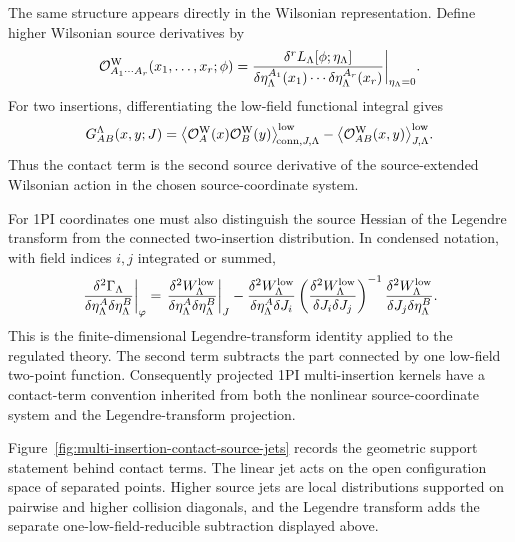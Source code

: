 The same structure appears directly in the Wilsonian representation.  Define
higher Wilsonian source derivatives by
\[
  \mathcal O^{\rm W}_{A_1\cdots A_r}(x_1,\ldots,x_r;\phi)
  =
  \frac{\delta^r L_\Lambda[\phi;\eta_\Lambda]}
       {\delta\eta_\Lambda^{A_1}(x_1)\cdots
        \delta\eta_\Lambda^{A_r}(x_r)}
  \bigg|_{\eta_\Lambda=0}.
\]
For two insertions, differentiating the low-field functional integral gives
\begin{equation}
  G^\Lambda_{AB}(x,y;J)
  =
  \bigl\langle
    \mathcal O^{\rm W}_A(x)\mathcal O^{\rm W}_B(y)
  \bigr\rangle_{\!{\rm conn},J,\Lambda}^{\rm low}
  -
  \bigl\langle
    \mathcal O^{\rm W}_{AB}(x,y)
  \bigr\rangle_{J,\Lambda}^{\rm low}.
  \label{eq:wilsonian-two-insertion-contact-term}
\end{equation}
Thus the contact term is the second source derivative of the
source-extended Wilsonian action in the chosen source-coordinate system.

For 1PI coordinates one must also distinguish the source Hessian of the
Legendre transform from the connected two-insertion distribution.  In
condensed notation, with field indices \(i,j\) integrated or summed,
\[
  \left.\frac{\delta^2\Gamma_\Lambda}
    {\delta\eta_\Lambda^A\delta\eta_\Lambda^B}\right|_\varphi
  =
  \left.\frac{\delta^2 W_\Lambda^{\rm low}}
    {\delta\eta_\Lambda^A\delta\eta_\Lambda^B}\right|_J
  -
  \frac{\delta^2 W_\Lambda^{\rm low}}
       {\delta\eta_\Lambda^A\delta J_i}
  \left(
    \frac{\delta^2 W_\Lambda^{\rm low}}
         {\delta J_i\delta J_j}
  \right)^{-1}
  \frac{\delta^2 W_\Lambda^{\rm low}}
       {\delta J_j\delta\eta_\Lambda^B}.
\]
This is the finite-dimensional Legendre-transform identity applied to the
regulated theory.  The second term subtracts the part connected by one
low-field two-point function.  Consequently projected 1PI multi-insertion
kernels have a contact-term convention inherited from both the nonlinear
source-coordinate system and the Legendre-transform projection.

Figure~\ref{fig:multi-insertion-contact-source-jets} records the geometric
support statement behind contact terms.  The linear jet acts on the open
configuration space of separated points.  Higher source jets are local
distributions supported on pairwise and higher collision diagonals, and the
Legendre transform adds the separate one-low-field-reducible subtraction
displayed above.

